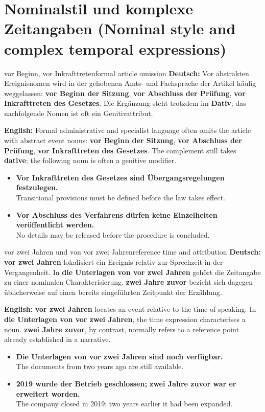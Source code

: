 \documentclass[a4paper,11pt]{article}
\newcommand{\GermanText}[1]{\textbf{Deutsch: }#1\par}
\newcommand{\EnglishText}[1]{{\small\color{SoftGray}\textbf{English: }#1\par}}
\newcommand{\ExampleItem}[2]{\item \textbf{#1}\\{\small\color{SoftGray}#2}}
\begin{document}
    \section{Nominalstil und komplexe Zeitangaben (Nominal style and complex temporal expressions)}
        \begin{grammarentry}{vor Beginn, vor Inkrafttreten}{formal article omission}
            \GermanText{Vor abstrakten Ereignisnomen wird in der gehobenen Amts- und Fachsprache der Artikel häufig weggelassen: \textbf{vor Beginn der Sitzung}, \textbf{vor Abschluss der Prüfung}, \textbf{vor Inkrafttreten des Gesetzes}. Die Ergänzung steht trotzdem im \textbf{Dativ}; das nachfolgende Nomen ist oft ein Genitivattribut.}
            \EnglishText{Formal administrative and specialist language often omits the article with abstract event nouns: \textbf{vor Beginn der Sitzung}, \textbf{vor Abschluss der Prüfung}, \textbf{vor Inkrafttreten des Gesetzes}. The complement still takes \textbf{dative}; the following noun is often a genitive modifier.}
        \end{grammarentry}
        \begin{exbox}
            \begin{itemize}
                \ExampleItem{Vor Inkrafttreten des Gesetzes sind Übergangsregelungen festzulegen.}{Transitional provisions must be defined before the law takes effect.}
                \ExampleItem{Vor Abschluss des Verfahrens dürfen keine Einzelheiten veröffentlicht werden.}{No details may be released before the procedure is concluded.}
            \end{itemize}
        \end{exbox}
        \begin{grammarentry}{vor zwei Jahren und von vor zwei Jahren}{reference time and attribution}
            \GermanText{\textbf{vor zwei Jahren} lokalisiert ein Ereignis relativ zur Sprechzeit in der Vergangenheit. In \textbf{die Unterlagen von vor zwei Jahren} gehört die Zeitangabe zu einer nominalen Charakterisierung. \textbf{zwei Jahre zuvor} bezieht sich dagegen üblicherweise auf einen bereits eingeführten Zeitpunkt der Erzählung.}
            \EnglishText{\textbf{vor zwei Jahren} locates an event relative to the time of speaking. In \textbf{die Unterlagen von vor zwei Jahren}, the time expression characterises a noun. \textbf{zwei Jahre zuvor}, by contrast, normally refers to a reference point already established in a narrative.}
        \end{grammarentry}
        \begin{exbox}
            \begin{itemize}
                \ExampleItem{Die Unterlagen von vor zwei Jahren sind noch verfügbar.}{The documents from two years ago are still available.}
                \ExampleItem{2019 wurde der Betrieb geschlossen; zwei Jahre zuvor war er erweitert worden.}{The company closed in 2019; two years earlier it had been expanded.}
            \end{itemize}
        \end{exbox}
\end{document}
